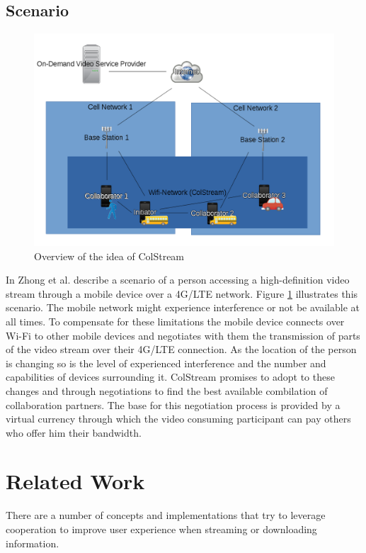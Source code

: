 \subsection{Scenario}
\begin{figure}[hbtp]
\centering
\includegraphics[scale=.6]{figures/Overview.png}
\caption{Overview of the idea of ColStream}
\label{ColStreamIdea}
\end{figure}
In \cite{ColStream} Zhong et al. describe a scenario of a person accessing a high-definition video stream through a mobile device over a 4G/LTE network. Figure \ref{ColStreamIdea} illustrates this scenario. The mobile network might experience interference or not be available at all times. To compensate for these limitations the mobile device connects over Wi-Fi to other mobile devices and negotiates with them the transmission of parts of the video stream over their 4G/LTE connection. As the location of the person is changing so is the level of experienced interference and the number and capabilities of devices surrounding it. ColStream promises to adopt to these changes and through negotiations to find the best available combilation of collaboration partners. The base for this negotiation process is provided by a virtual currency through which the video consuming participant can pay others who offer him their bandwidth.



\section{Related Work}\label{relWork}
There are a number of concepts and implementations that try to leverage cooperation to improve user experience when streaming or downloading information.
